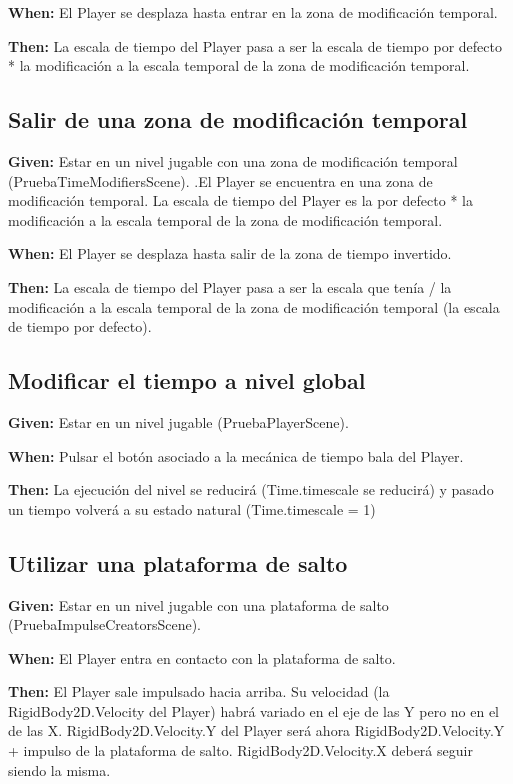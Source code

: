 \textbf{When:} El Player se desplaza hasta entrar en la zona de modificación temporal.

\textbf{Then:} La escala de tiempo del Player pasa a ser la escala de tiempo por defecto * la modificación a la escala temporal de la zona de modificación temporal.

\subsection{Salir de una zona de modificación temporal}
\textbf{Given:} Estar en un nivel jugable con una zona de modificación temporal (PruebaTimeModifiersScene). .El Player se encuentra en una zona de modificación temporal. La escala de tiempo del Player es la por defecto * la modificación a la escala temporal de la zona de modificación temporal.

\textbf{When:} El Player se desplaza hasta salir de la zona de tiempo invertido.

\textbf{Then:} La escala de tiempo del Player pasa a ser la escala que tenía / la modificación a la escala temporal de la zona de modificación temporal (la escala de tiempo por defecto).

\subsection{Modificar el tiempo a nivel global}
\textbf{Given:} Estar en un nivel jugable (PruebaPlayerScene).

\textbf{When:} Pulsar el botón asociado a la mecánica de tiempo bala del Player.

\textbf{Then:} La ejecución del nivel se reducirá (Time.timescale se reducirá) y pasado un tiempo volverá a su estado natural (Time.timescale = 1)

\subsection{Utilizar una plataforma de salto}
\textbf{Given:} Estar en un nivel jugable con una plataforma de salto (PruebaImpulseCreatorsScene).

\textbf{When:} El Player entra en contacto con la plataforma de salto.

\textbf{Then:} El Player sale impulsado hacia arriba. Su velocidad (la RigidBody2D.Velocity del Player) habrá variado en el eje de las Y pero no en el de las X. RigidBody2D.Velocity.Y del Player será ahora RigidBody2D.Velocity.Y + impulso de la plataforma de salto. RigidBody2D.Velocity.X deberá seguir siendo la misma.

